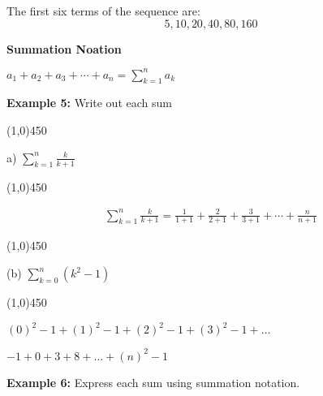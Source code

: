 \documentclass{report}
\begin{document}
The first six terms of the sequence are:
$$\boxed{5,10,20,40,80,160}$$
\newpage
\begin{LARGE}
	\begin{center}
		\textbf{Summation Noation} 
	\end{center}
\end{LARGE}
\begin{mdframed}
	\vspace{5mm}
	\begin{center}
		\begin{large}
		  
			$a_1+a_2+a_3+\cdots+a_n=\sum_{k=1}^{n} a_k$
		\end{large}
\end{center}
\vspace{5mm} 
\end{mdframed}
\bigbreak \noindent \bigbreak \noindent
{}
\bigbreak \noindent \bigbreak \noindent
\begin{center}
 \begin{large}
 \textbf{Example 5:}
 Write out each sum
 \end{large} 
\end{center}

\line(1,0){450}

\begin{center}
\begin{large}
a) $\sum_{k=1}^n \frac{k}{k+1}$
\end{large}
\end{center}

\line(1,0){450}

\begin{align*}
	\sum_{k=1}^n \frac{k}{k+1}=\frac{1}{1+1}+\frac{2}{2+1}+\frac{3}{3+1}+\cdots+\frac{n}{n+1}
\end{align*}
\bigbreak \noindent \bigbreak \noindent

\line(1,0){450}

\begin{center}
\begin{large}
(b) $\sum_{k=0}^n\left(k^2-1\right)$
\end{large}
\end{center}

\line(1,0){450}
\vspace{3mm}

\begin{center}
	$(0)^2 - 1 + (1)^2 - 1 + (2)^2 - 1 + (3)^2 - 1 + \ldots$
	\vspace{5mm}

$-1 + 0 + 3 + 8 +\ldots + (n)^2 -1$
\end{center}
\bigbreak \noindent \bigbreak \noindent
\begin{center}
 \begin{large}
	 \textbf{Example 6:} 
	 Express each sum using summation notation.
 \end{large} 
\end{center}
\end{document}
